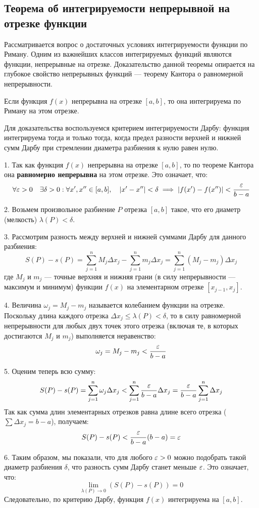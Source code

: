 \subsection{Теорема об интегрируемости непрерывной на отрезке функции}

Рассматривается вопрос о достаточных условиях интегрируемости функции по Риману. Одним из важнейших классов интегрируемых функций являются функции, непрерывные на отрезке. Доказательство данной теоремы опирается на глубокое свойство непрерывных функций — теорему Кантора о равномерной непрерывности.

\begin{theorem}
Если функция $f(x)$ непрерывна на отрезке $[a, b]$, то она интегрируема по Риману на этом отрезке.
\end{theorem}

\begin{tcolorbox}[title=Доказательство, breakable]
Для доказательства воспользуемся критерием интегрируемости Дарбу: функция интегрируема тогда и только тогда, когда предел разности верхней и нижней сумм Дарбу при стремлении диаметра разбиения к нулю равен нулю.

1. Так как функция $f(x)$ непрерывна на отрезке $[a, b]$, то по теореме Кантора она \textbf{равномерно непрерывна} на этом отрезке. Это означает, что:
\[ \forall \varepsilon > 0 \quad \exists \delta > 0 : \forall x', x'' \in [a, b], \quad |x' - x''| < \delta \implies |f(x') - f(x'')| < \frac{\varepsilon}{b-a} \]

2. Возьмем произвольное разбиение $P$ отрезка $[a, b]$ такое, что его диаметр (мелкость) $\lambda(P) < \delta$. 

3. Рассмотрим разность между верхней и нижней суммами Дарбу для данного разбиения:
\[ S(P) - s(P) = \sum_{j=1}^n M_j \Delta x_j - \sum_{j=1}^n m_j \Delta x_j = \sum_{j=1}^n (M_j - m_j) \Delta x_j \]
где $M_j$ и $m_j$ — точные верхняя и нижняя грани (в силу непрерывности — максимум и минимум) функции $f(x)$ на элементарном отрезке $[x_{j-1}, x_j]$.

4. Величина $\omega_j = M_j - m_j$ называется колебанием функции на отрезке. Поскольку длина каждого отрезка $\Delta x_j \le \lambda(P) < \delta$, то в силу равномерной непрерывности для любых двух точек этого отрезка (включая те, в которых достигаются $M_j$ и $m_j$) выполняется неравенство:
\[ \omega_j = M_j - m_j < \frac{\varepsilon}{b-a} \]

5. Оценим теперь всю сумму:
\[ S(P) - s(P) = \sum_{j=1}^n \omega_j \Delta x_j < \sum_{j=1}^n \frac{\varepsilon}{b-a} \Delta x_j = \frac{\varepsilon}{b-a} \sum_{j=1}^n \Delta x_j \]
Так как сумма длин элементарных отрезков равна длине всего отрезка ($\sum \Delta x_j = b - a$), получаем:
\[ S(P) - s(P) < \frac{\varepsilon}{b-a} (b - a) = \varepsilon \]

6. Таким образом, мы показали, что для любого $\varepsilon > 0$ можно подобрать такой диаметр разбиения $\delta$, что разность сумм Дарбу станет меньше $\varepsilon$. Это означает, что:
\[ \lim_{\lambda(P) \to 0} (S(P) - s(P)) = 0 \]
Следовательно, по критерию Дарбу, функция $f(x)$ интегрируема на $[a, b]$.
\end{tcolorbox}

